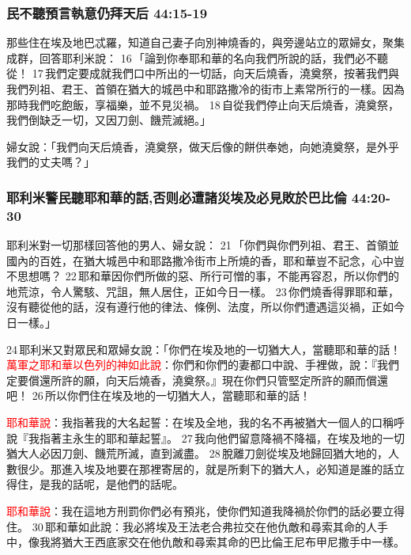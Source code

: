 \subsubsection{民不聽預言執意仍拜天后 44:15-19}
那些住在埃及地巴忒羅，知道自己妻子向別神燒香的，與旁邊站立的眾婦女，聚集成群，回答耶利米說： 16 「論到你奉耶和華的名向我們所說的話，我們必不聽從！ 17 我們定要成就我們口中所出的一切話，向天后燒香，澆奠祭，按著我們與我們列祖、君王、首領在猶大的城邑中和耶路撒冷的街市上素常所行的一樣。因為那時我們吃飽飯，享福樂，並不見災禍。 18 自從我們停止向天后燒香，澆奠祭，我們倒缺乏一切，又因刀劍、饑荒滅絕。」

婦女說：「我們向天后燒香，澆奠祭，做天后像的餅供奉她，向她澆奠祭，是外乎我們的丈夫嗎？」

\subsubsection{耶利米警民聽耶和華的話,否则必遭諸災埃及必見敗於巴比倫 44:20-30}
耶利米對一切那樣回答他的男人、婦女說： 21 「你們與你們列祖、君王、首領並國內的百姓，在猶大城邑中和耶路撒冷街市上所燒的香，耶和華豈不記念，心中豈不思想嗎？ 22 耶和華因你們所做的惡、所行可憎的事，不能再容忍，所以你們的地荒涼，令人驚駭、咒詛，無人居住，正如今日一樣。 23 你們燒香得罪耶和華，沒有聽從他的話，沒有遵行他的律法、條例、法度，所以你們遭遇這災禍，正如今日一樣。」

24 耶利米又對眾民和眾婦女說：「你們在埃及地的一切猶大人，當聽耶和華的話！\textcolor{red}{萬軍之耶和華以色列的神如此說}：你們和你們的妻都口中說、手裡做，說：『我們定要償還所許的願，向天后燒香，澆奠祭。』現在你們只管堅定所許的願而償還吧！ 26 所以你們住在埃及地的一切猶大人，當聽耶和華的話！

\textcolor{red}{耶和華說}：我指著我的大名起誓：在埃及全地，我的名不再被猶大一個人的口稱呼說『我指著主永生的耶和華起誓』。 27 我向他們留意降禍不降福，在埃及地的一切猶大人必因刀劍、饑荒所滅，直到滅盡。 28 脫離刀劍從埃及地歸回猶大地的，人數很少。那進入埃及地要在那裡寄居的，就是所剩下的猶大人，必知道是誰的話立得住，是我的話呢，是他們的話呢。

\textcolor{red}{耶和華說}：我在這地方刑罰你們必有預兆，使你們知道我降禍於你們的話必要立得住。 30 耶和華如此說：我必將埃及王法老合弗拉交在他仇敵和尋索其命的人手中，像我將猶大王西底家交在他仇敵和尋索其命的巴比倫王尼布甲尼撒手中一樣。

